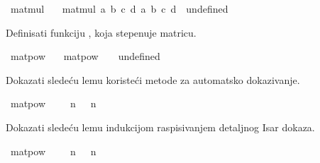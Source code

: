 \begin{isabellebody}
\begin{exercise}[subtitle=Množenje matrica]
\begin{isamarkuptext}
\end{isamarkuptext}\isamarkuptrue%
\isamarkupfalse%
\ mat{\isacharunderscore}{\kern0pt}mul\ \isanewline
\ \ {\isachardoublequoteopen}mat{\isacharunderscore}{\kern0pt}mul\ {\isacharparenleft}{\kern0pt}a{}{\isacharcomma}{\kern0pt}\ b{}{\isacharcomma}{\kern0pt}\ c{}{\isacharcomma}{\kern0pt}\ d{}{\isacharparenright}{\kern0pt}\ {\isacharparenleft}{\kern0pt}a{}{\isacharcomma}{\kern0pt}\ b{}{\isacharcomma}{\kern0pt}\ c{}{\isacharcomma}{\kern0pt}\ d{}{\isacharparenright}{\kern0pt}\ {\isacharequal}{\kern0pt}\ undefined{\isachardoublequoteclose}%
\begin{isamarkuptext}%
Definisati funkciju , koja stepenuje matricu.%
\end{isamarkuptext}\isamarkuptrue%
\isamarkupfalse%
\ mat{\isacharunderscore}{\kern0pt}pow\ \isanewline
\ \ {\isachardoublequoteopen}mat{\isacharunderscore}{\kern0pt}pow\ {\isacharunderscore}{\kern0pt}\ {\isacharunderscore}{\kern0pt}\ {\isacharequal}{\kern0pt}\ undefined{\isachardoublequoteclose}%
\begin{isamarkuptext}%
Dokazati sledeću lemu koristeći metode za automatsko dokazivanje.%
\end{isamarkuptext}\isamarkuptrue%
\isamarkupfalse%
\ {\isachardoublequoteopen}mat{\isacharunderscore}{\kern0pt}pow\ {\isacharparenleft}{\kern0pt}{}{\isacharcomma}{\kern0pt}\ {}{\isacharcomma}{\kern0pt}\ {}{\isacharcomma}{\kern0pt}\ {}{\isacharparenright}{\kern0pt}\ n\ {\isacharequal}{\kern0pt}\ {\isacharparenleft}{\kern0pt}{}{\isacharcomma}{\kern0pt}\ n{\isacharcomma}{\kern0pt}\ {}{\isacharcomma}{\kern0pt}\ {}{\isacharparenright}{\kern0pt}{\isachardoublequoteclose}%
\isadelimproof
%
\endisadelimproof
%
\isatagproof
%
\endisatagproof
{\isafoldproof}%
%
\isadelimproof
%
\endisadelimproof
%
\begin{isamarkuptext}%
Dokazati sledeću lemu indukcijom raspisivanjem detaljnog Isar dokaza.%
\end{isamarkuptext}\isamarkuptrue%
\isamarkupfalse%
\ {\isachardoublequoteopen}mat{\isacharunderscore}{\kern0pt}pow\ {\isacharparenleft}{\kern0pt}{}{\isacharcomma}{\kern0pt}\ {}{\isacharcomma}{\kern0pt}\ {}{\isacharcomma}{\kern0pt}\ {}{\isacharparenright}{\kern0pt}\ n\ {\isacharequal}{\kern0pt}\ {\isacharparenleft}{\kern0pt}{}{\isacharcomma}{\kern0pt}\ n{\isacharcomma}{\kern0pt}\ {}{\isacharcomma}{\kern0pt}\ {}{\isacharparenright}{\kern0pt}{\isachardoublequoteclose}%

\end{exercise}
\end{isabellebody}
